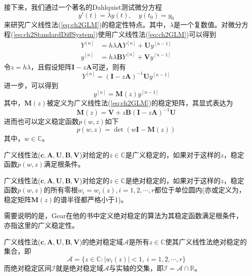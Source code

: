 接下来，我们通过一个著名的Dahlquist测试微分方程
\begin{equation}
y'(t)=\lambda y(t),\quad y(t_0)=y_0\label{eq:ch2StandardDiffSystem}
\end{equation}
来研究广义线性法(\ref{eq:ch2GLM})的稳定性特点。其中，$\lambda$是一个复数值。对微分方程(\ref{eq:ch2StandardDiffSystem})使用广义线性法(\ref{eq:ch2GLM})可以得到
\begin{subequations}
\begin{align}
{Y}^{[n]}&=h\lambda\bm{A}Y^{[n]}+\bm{U}y^{[n-1]}\\
y^{[n]}&=h\lambda \bm{B}Y^{[n]}+\bm{V}y^{[n-1]}
\end{align}
\end{subequations}
令$z=h\lambda$，且假设矩阵$\bm{I}-z\bm{A}$可逆，则有
\begin{equation}
Y^{[n]}=(\bm{I}-z\bm{A})^{-1}\bm{U}y^{[n-1]}
\end{equation}
进一步，可以得到
\begin{equation}
y^{[n]}=\bm{M}(z)y^{[n-1]}
\end{equation}
其中，$\bm{M}(z)$被定义为广义线性法(\ref{eq:ch2GLM})的稳定矩阵，其显式表达为
\begin{equation}
\bm{M}(z)=\bm{V}+z\bm{B}(\bm{I}-z\bm{A})^{-1}\bm{U}
\end{equation}
进而也可以定义稳定函数$p(w,z)$如下
\begin{equation}
p(w,z)=\det(w\bm{I}-\bm{M}(z))
\end{equation}
其中，$w\in\mathbb{C}$。
\begin{definition}[广义稳定的]
广义线性法($\bm{c},\bm{A},\bm{U},\bm{B},\bm{V}$)对给定的$z\in\mathbb{C}$是广义稳定的\cite{LiShouFo2010a}，如果对于这样的$z$，稳定函数$p(w,z)$满足根条件。
\end{definition}%
\begin{definition}[绝对稳定性]
广义线性法($\bm{c},\bm{A},\bm{U},\bm{B},\bm{V}$)对给定的$z\in\mathbb{C}$是绝对稳定的\cite{Jackiewicz2009a,LiShouFo2010a}，如果对于这样的$z$，稳定函数$p(w,z)$的所有零根$w_i=w_i(z),i=1,2,\cdots,r$都位于单位圆内(亦或定义为，稳定矩阵$\bm{M}(z)$的谱半径都严格小于1)。
\end{definition}%

需要说明的是，Gear在他的书中定义绝对稳定的算法为其稳定函数满足根条件，亦指这里的广义稳定性。
\begin{definition}[绝对稳定域/区间]
广义线性法($\bm{c},\bm{A},\bm{U},\bm{B},\bm{V}$)的绝对稳定域$\mathcal{A}$是所有$z\in\mathbb{C}$使其广义线性法绝对稳定的集合，即
\begin{equation}
\mathcal{A}=\{z\in\mathbb{C}:|w_i(z)|<1,\ i=1,2,\cdots,r\}
\end{equation}
而绝对稳定区间$\mathcal{I}$就是绝对稳定域$\mathcal{A}$与实轴的交集，即$\mathcal{I}=\mathcal{A}\cap\mathbb{R}$。
\end{definition}

